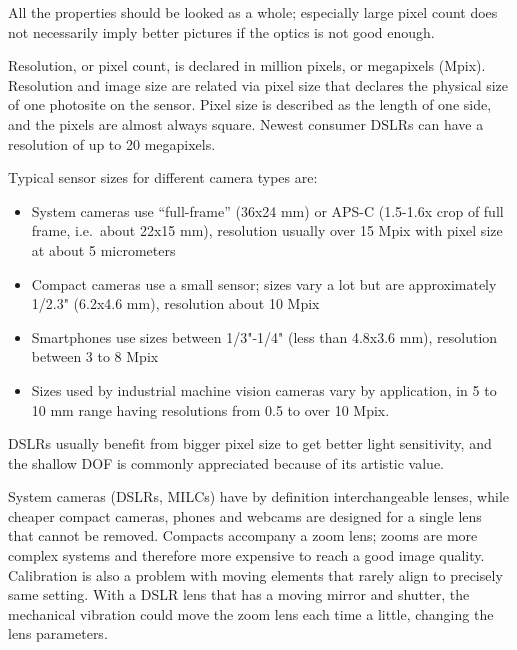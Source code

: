 All the properties should be looked as a whole; especially large pixel count does not necessarily imply better pictures if the optics is not good enough.

Resolution, or pixel count, is declared in million pixels, or megapixels (Mpix).
Resolution and image size are related via pixel size that declares the physical size of one photosite on the sensor.
Pixel size is described as the length of one side, and the pixels are almost always square.
Newest consumer DSLRs can have a resolution of up to 20 megapixels.




Typical sensor sizes for different camera types are:

\begin{itemize}
	\item System cameras use ``full-frame'' (36x24 mm) or APS-C (1.5-1.6x crop of full frame, i.e.~about 22x15 mm), resolution usually over 15 Mpix with pixel size at about 5 micrometers
	\item Compact cameras use a small sensor; sizes vary a lot but are approximately 1/2.3" (6.2x4.6 mm), resolution about 10 Mpix
	\item Smartphones use sizes between 1/3"-1/4" (less than 4.8x3.6 mm), resolution between 3 to 8 Mpix
	\item Sizes used by industrial machine vision cameras vary by application, in 5 to 10 mm range having resolutions from 0.5 to over 10 Mpix.
\end{itemize}

DSLRs usually benefit from bigger pixel size to get better light sensitivity, and the shallow DOF is commonly appreciated because of its artistic value.



System cameras (DSLRs, MILCs) have by definition interchangeable lenses, while cheaper compact cameras, phones and webcams are designed for a single lens that cannot be removed.
Compacts accompany a zoom lens; zooms are more complex systems and therefore more expensive to reach a good image quality.
Calibration is also a problem with moving elements that rarely align to precisely same setting.
With a DSLR lens that has a moving mirror and shutter, the mechanical vibration could move the zoom lens each time a little, changing the lens parameters.

